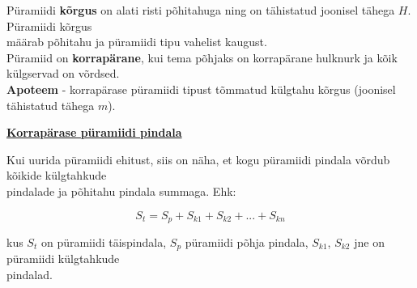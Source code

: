 \begin{center}
{{{\begin{flushleft}

\vspace{2mm}
\hspace{5mm}
Püramiidi \textbf{kõrgus} on alati risti põhitahuga ning on tähistatud joonisel tähega $H$. Püramiidi kõrgus\\ \hspace{5mm} määrab põhitahu ja püramiidi tipu vahelist kaugust.\\ \hspace{5mm}
 Püramiid on \textbf{korrapärane}, kui tema põhjaks on korrapärane hulknurk ja kõik külgservad on võrdsed.\\ \hspace{5mm} 
\textbf{Apoteem} - korrapärase püramiidi tipust tõmmatud külgtahu kõrgus (joonisel tähistatud tähega $m$).

\vspace{2mm}
\hspace{5mm}
\textbf{\underline{Korrapärase püramiidi pindala}}

\vspace{2mm}
\hspace{5mm}
Kui uurida püramiidi ehitust, siis on näha, et kogu püramiidi pindala võrdub kõikide külgtahkude\\ \hspace{5mm} pindalade ja põhitahu pindala summaga. Ehk:

\begin{equation}
\label{42_eq1}
S_{t}=S_{p}+S_{k1}+S_{k2}+...+S_{kn}
\end{equation}

\hspace{5mm}
kus $S_{t}$ on püramiidi täispindala, $S_{p}$ püramiidi põhja pindala, $S_{k1}$, $S_{k2}$ jne on püramiidi külgtahkude\\ \hspace{5mm} pindalad.


\end{flushleft}}}}
\end{center}
